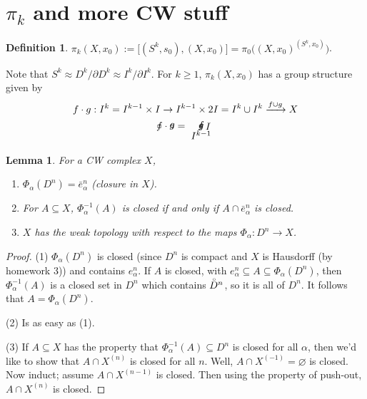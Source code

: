 \documentclass[12pt]{article}
\theoremstyle{plain}
\newtheorem{lemma}[equation]{Lemma}
\theoremstyle{definition}
\newtheorem{definition}[equation]{Definition}
\theoremstyle{remark}
\newcommand{\inn}[1]{\accentset{\circ}{#1}}
\begin{document}
 \section{$\pi_k$ and more CW stuff}
 \begin{definition}
   $\pi_k(X,x_0) := \bigl[ (S^k,s_0),(X,x_0)\bigr] = \pi_0\bigl( (X,x_0)^{(S^k,x_0)}\bigr)$.
 \end{definition}
 Note that $S^k\approx D^k/\partial D^k \approx I^k/\partial I^k$. For $k\ge 1$,
 $\pi_k(X,x_0)$ has a group structure given by
 \begin{gather*}
    f\cdot g: I^k = I^{k-1}\times I \to I^{k-1} \times 2I=I^k \cup I^k
    \xrightarrow{f\cup g} X\\
    \begin{xy} 0 *=(1,1)\frm{-} *{f} \end{xy} \cdot
    \begin{xy} 0 *=(1,1)\frm{-} *{g} \end{xy} =
    \begin{xy}
      0 *=(1,.5)!UR\frm{-} *=(1,.5)!DR\frm{-} *+!L{I};
      (-.5,.25) *{f}; (-.5,-.25) *{g}; (-.5,-.5) *+!U{I^{k-1}}
    \end{xy}
 \end{gather*}
 \begin{lemma} For a CW complex $X$,
   \begin{enumerate}
     \item $\Phi_\alpha(D^n)=\bar e^n_\alpha$ (closure in $X$).
     \item For $A\subseteq X$, $\Phi_\alpha^{-1}(A)$ is closed if and only if $A\cap \bar
     e^n_\alpha$ is closed.
     \item $X$ has the weak topology with respect to the maps $\Phi_\alpha:D^n\to X$.
   \end{enumerate}
 \end{lemma}
 \begin{proof}
   (1) $\Phi_\alpha(D^n)$ is closed (since $D^n$ is compact and $X$ is Hausdorff (by
   homework 3)) and contains $e^n_\alpha$. If $A$ is closed, with $e^n_\alpha\subseteq
   A\subseteq \Phi_\alpha(D^n)$, then $\Phi_\alpha^{-1}(A)$ is a closed set in $D^n$
   which contains $\inn D^n$, so it is all of $D^n$. It follows that
   $A=\Phi_\alpha(D^n)$.

   (2) Is as easy as (1).

   (3) If $A\subseteq X$ has the property that $\Phi_\alpha^{-1}(A)\subseteq D^n$ is
   closed for all $\alpha$, then we'd like to show that $A\cap X^{(n)}$ is closed for all
   $n$. Well, $A\cap X^{(-1)}=\varnothing$ is closed. Now induct; assume $A\cap
   X^{(n-1)}$ is closed. Then using the property of push-out, $A\cap X^{(n)}$ is closed.
 \end{proof}
\end{document}

